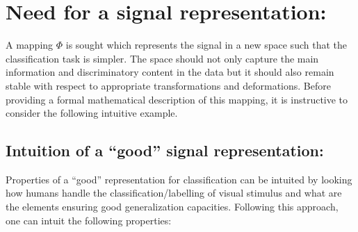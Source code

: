 \documentclass[a4paper,11pt]{report}
\begin{document}
	\section{Need for a signal representation:}
		\label{sec:Intro/Signal rep}
		
		A mapping $\Phi$ is sought which represents the signal in a new space such that the classification task is simpler. The space should not only capture the main information and discriminatory content in the data but it should also remain stable with respect to appropriate transformations and deformations. Before providing a formal mathematical description of this mapping, it is instructive to consider the following intuitive example.
%     
		\subsection{Intuition of a ``good'' signal representation:}
      \label{sec:Intro/Signal rep/Intuition}
      
      Properties of a ``good'' representation for classification can be intuited by looking how humans handle the classification/labelling of visual stimulus and what are the elements ensuring good generalization capacities. Following this approach, one can intuit the following properties:\\
            
\end{document}

